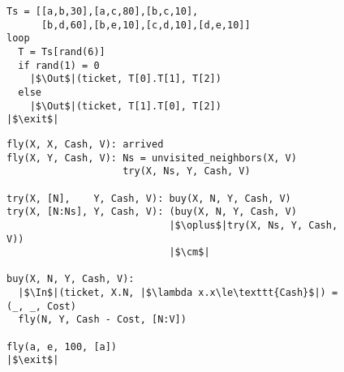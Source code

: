 \begin{figure}[tb]
\begin{lstlisting}[label=lst:tsell,caption=Ticket Seller's Agent. \texttt{[...]} denotes a list while \texttt{X[$i$]} is the $i$-th element of list \texttt{X}. \texttt{rand($m$)} returns a random integer between $0$ and $m$ (inclusive). \texttt{X.Y} denotes the concatenation of symbols so that \texttt{u.v} evaluates to \texttt{uv}.]
Ts = [[a,b,30],[a,c,80],[b,c,10],
      [b,d,60],[b,e,10],[c,d,10],[d,e,10]]
loop
  T = Ts[rand(6)]
  if rand(1) = 0
    |$\Out$|(ticket, T[0].T[1], T[2])
  else
    |$\Out$|(ticket, T[1].T[0], T[2])
|$\exit$|
\end{lstlisting}
\begin{lstlisting}[label=lst:tbuy,caption={Ticket Buyer's Agent. Both {\tt fly()} and {\tt try()} are defined using pattern matching on parameters. \texttt{[N:Ns]} denotes a list which has \texttt{N} as its head and \texttt{Ns} as its tail. Underscore (\texttt{\_}) matches anything in the context of pattern matching.}]
fly(X, X, Cash, V): arrived
fly(X, Y, Cash, V): Ns = unvisited_neighbors(X, V)
                    try(X, Ns, Y, Cash, V)

try(X, [N],    Y, Cash, V): buy(X, N, Y, Cash, V)
try(X, [N:Ns], Y, Cash, V): (buy(X, N, Y, Cash, V)
                            |$\oplus$|try(X, Ns, Y, Cash, V))
                            |$\cm$|

buy(X, N, Y, Cash, V):
  |$\In$|(ticket, X.N, |$\lambda x.x\le\texttt{Cash}$|) = (_, _, Cost)
  fly(N, Y, Cash - Cost, [N:V])

fly(a, e, 100, [a])
|$\exit$|
\end{lstlisting}
\vspace*{-5mm}
\end{figure}
